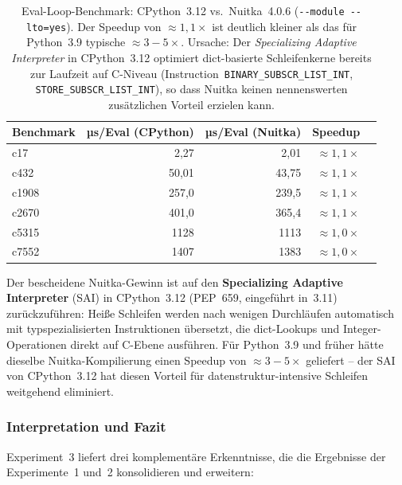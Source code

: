 ﻿\documentclass[a4paper,12pt]{article}
\theoremstyle{definition}
\begin{document}
\begin{table}[h]
  \centering
  \begin{tabular}{lrrrr}
    \toprule
    \textbf{Benchmark} & \textbf{ µs/Eval (CPython)} & \textbf{ µs/Eval (Nuitka)}
      & \textbf{Speedup} \\
    \midrule
    c17   &   2{,}27 &  2{,}01 & ${\approx}1{,}1\times$ \\
    c432  &  50{,}01 & 43{,}75 & ${\approx}1{,}1\times$ \\
    c1908 & 257{,}0  & 239{,}5 & ${\approx}1{,}1\times$ \\
    c2670 & 401{,}0  & 365{,}4 & ${\approx}1{,}1\times$ \\
    c5315 & 1128     & 1113    & ${\approx}1{,}0\times$ \\
    c7552 & 1407     & 1383    & ${\approx}1{,}0\times$ \\
    \bottomrule
  \end{tabular}
  \caption{Eval-Loop-Benchmark: CPython~3.12 vs.\ Nuitka~4.0.6
    (\texttt{-{}-module -{}-lto=yes}).  Der Speedup von
    ${\approx}1{,}1\times$ ist deutlich kleiner als das für Python~3.9
    typische ${\approx}3{-}5\times$.  Ursache: Der \emph{Specializing
    Adaptive Interpreter} in CPython~3.12 optimiert dict-basierte
    Schleifenkerne bereits zur Laufzeit auf C-Niveau
    (Instruction~\texttt{BINARY\_SUBSCR\_LIST\_INT},
    \texttt{STORE\_SUBSCR\_LIST\_INT}), so dass Nuitka keinen nennenswerten
    zusätzlichen Vorteil erzielen kann.}
  \label{tab:nuitka-speedup}
\end{table}

Der bescheidene Nuitka-Gewinn ist auf den \textbf{Specializing Adaptive
Interpreter} (SAI) in CPython~3.12 (PEP~659, eingeführt in~3.11)
zurückzuführen: Heiße Schleifen werden nach wenigen Durchläufen
automatisch mit typspezialisierten Instruktionen übersetzt, die
dict-Lookups und Integer-Operationen direkt auf C-Ebene ausführen.
Für Python~3.9 und früher hätte dieselbe Nuitka-Kompilierung einen
Speedup von ${\approx}3{-}5\times$ geliefert -- der SAI von CPython~3.12
hat diesen Vorteil für datenstruktur-intensive Schleifen weitgehend
eliminiert.

\subsubsection{Interpretation und Fazit}

Experiment~3 liefert drei komplementäre Erkenntnisse, die die
Ergebnisse der Experimente~1 und~2 konsolidieren und erweitern:
\end{document}
